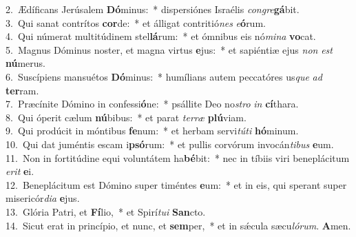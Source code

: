 {2.~}Ædíficans Jerúsalem \textbf{Dó}minus:~* dispersiónes Israélis \textit{con}\textit{gre}\textbf{gá}bit.\\
{3.~}Qui sanat contrítos \textbf{cor}de:~* et álligat contritió\textit{nes} \textit{e}\textbf{ó}rum.\\
{4.~}Qui númerat multitúdinem stel\textbf{lá}rum:~* et ómnibus eis nó\textit{mi}\textit{na} \textbf{vo}cat.\\
{5.~}Magnus Dóminus noster, et magna virtus \textbf{e}jus:~* et sapiéntiæ ejus \textit{non} \textit{est} \textbf{nú}merus.\\
{6.~}Suscípiens mansuétos \textbf{Dó}minus:~* humílians autem peccatóres us\textit{que} \textit{ad} \textbf{ter}ram.\\
{7.~}Præcínite Dómino in confessi\textbf{ó}ne:~* psállite Deo no\textit{stro} \textit{in} \textbf{cí}thara.\\
{8.~}Qui óperit cælum \textbf{nú}bibus:~* et parat \textit{ter}\textit{ræ} \textbf{plú}viam.\\
{9.~}Qui prodúcit in móntibus \textbf{fe}num:~* et herbam servi\textit{tú}\textit{ti} \textbf{hó}minum.\\
{10.~}Qui dat juméntis escam i\textbf{psó}rum:~* et pullis corvórum invocán\textit{ti}\textit{bus} \textbf{e}um.\\
{11.~}Non in fortitúdine equi voluntátem ha\textbf{bé}bit:~* nec in tíbiis viri beneplácitum \textit{e}\textit{rit} \textbf{e}i.\\
{12.~}Beneplácitum est Dómino super timéntes \textbf{e}um:~* et in eis, qui sperant super misericór\textit{di}\textit{a} \textbf{e}jus.\\
{13.~}Glória Patri, et \textbf{Fí}lio,~* et Spirí\textit{tu}\textit{i} \textbf{San}cto.\\
{14.~}Sicut erat in princípio, et nunc, et \textbf{sem}per,~* et in sǽcula sæcu\textit{ló}\textit{rum}. \textbf{A}men.\\

